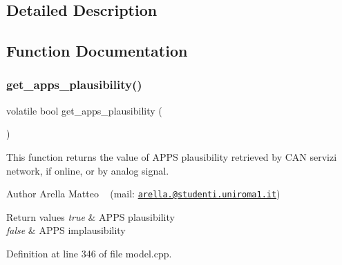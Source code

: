 \subsection{Detailed Description}


\subsection{Function Documentation}
\mbox{\label{group___board__model__group_gae0acabf32ee7f2a82b2f9149ba3d1978}} 
\subsubsection{\texorpdfstring{get\+\_\+apps\+\_\+plausibility()}{get\_apps\_plausibility()}}
{\footnotesize\ttfamily volatile bool get\+\_\+apps\+\_\+plausibility (\begin{DoxyParamCaption}{ }\end{DoxyParamCaption})}



This function returns the value of A\+P\+PS plausibility retrieved by C\+AN servizi network, if online, or by analog signal. 

\begin{DoxyAuthor}{Author}
Arella Matteo ~\newline
 (mail\+: \href{mailto:arella.1646983@studenti.uniroma1.it}{\tt arella.@studenti.\+uniroma1.\+it})
\end{DoxyAuthor}

\begin{DoxyRetVals}{Return values}
{\em true} & A\+P\+PS plausibility \\
\hline
{\em false} & A\+P\+PS implausibility \\
\hline
\end{DoxyRetVals}


Definition at line 346 of file model.\+cpp.

\mbox{\label{group___board__model__group_ga6db41e7368919bc4dfafaf4e400ae1a9}} 
